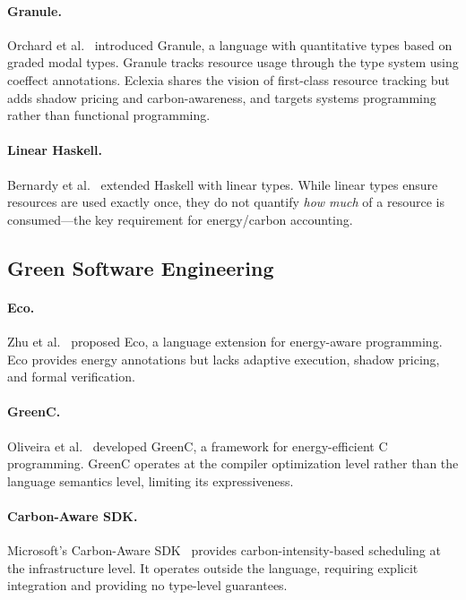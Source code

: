 \documentclass[11pt,a4paper]{article}
\begin{document}
\paragraph{Granule.}
Orchard et al.~\cite{orchard2019} introduced Granule, a language with
quantitative types based on graded modal types.  Granule tracks resource usage
through the type system using coeffect annotations.  Eclexia shares the vision
of first-class resource tracking but adds shadow pricing and carbon-awareness,
and targets systems programming rather than functional programming.

\paragraph{Linear Haskell.}
Bernardy et al.~\cite{bernardy2018} extended Haskell with linear types.
While linear types ensure resources are used exactly once, they do not quantify
\emph{how much} of a resource is consumed---the key requirement for
energy/carbon accounting.

\subsection{Green Software Engineering}

\paragraph{Eco.}
Zhu et al.~\cite{zhu2012} proposed Eco, a language extension for
energy-aware programming.  Eco provides energy annotations but lacks
adaptive execution, shadow pricing, and formal verification.

\paragraph{GreenC.}
Oliveira et al.~\cite{oliveira2017} developed GreenC, a framework for
energy-efficient C programming.  GreenC operates at the compiler optimization
level rather than the language semantics level, limiting its expressiveness.

\paragraph{Carbon-Aware SDK.}
Microsoft's Carbon-Aware SDK~\cite{microsoft_carbon_sdk} provides
carbon-intensity-based scheduling at the infrastructure level.  It operates
outside the language, requiring explicit integration and providing no
type-level guarantees.
\end{document}

